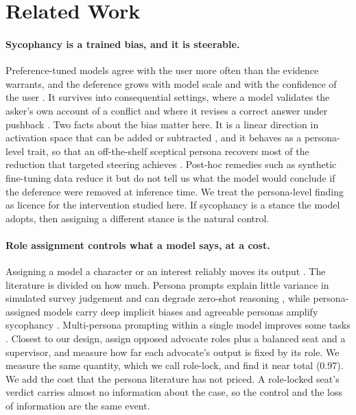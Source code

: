 
\section{Related Work}
\label{sec-related}

\paragraph{Sycophancy is a trained bias, and it is steerable.}
Preference-tuned models agree with the user more often than the evidence
warrants, and the deference grows with model scale and with the confidence
of the user \citep{perez2023discovering,sharma23}. It survives into
consequential settings, where a model validates the asker's own account of
a conflict \citep{cheng25elephant} and where it revises a correct answer
under pushback \citep{fanous2025syceval,malmqvist24}. Two facts about the
bias matter here. It is a linear direction in activation space that can be
added or subtracted \citep{rimsky2024caa}, and it behaves as a persona-level
trait, so that an off-the-shelf sceptical persona recovers most of the
reduction that targeted steering achieves \citep{chen2025persona,kelkar2026devil}.
Post-hoc remedies such as synthetic fine-tuning data reduce it
\citep{wei2023synthetic} but do not tell us what the model would conclude
if the deference were removed at inference time. We treat the persona-level
finding as licence for the intervention studied here. If sycophancy is a
stance the model adopts, then assigning a different stance is the natural
control.

\paragraph{Role assignment controls what a model says, at a cost.}
Assigning a model a character or an interest reliably moves its output
\citep{shanahan2023roleplay,li2023camel}. The literature is divided on how
much. Persona prompts explain little variance in simulated survey judgement
\citep{hu2024persona} and can degrade zero-shot reasoning
\citep{kim2025persona}, while persona-assigned models carry deep implicit
biases \citep{gupta2024bias,deshpande2023toxicity} and agreeable personas
amplify sycophancy \citep{shah2026toonice}. Multi-persona prompting within a
single model improves some tasks \citep{wang2024spp}. Closest to our design,
\citet{dietrich2026roles} assign opposed advocate roles plus a balanced seat
and a supervisor, and measure how far each advocate's output is fixed by its
role. We measure the same quantity, which we call role-lock, and find it
near total (0.97). We add the cost that the persona literature has not
priced. A role-locked seat's verdict carries almost no information about the
case, so the control and the loss of information are the same event.

